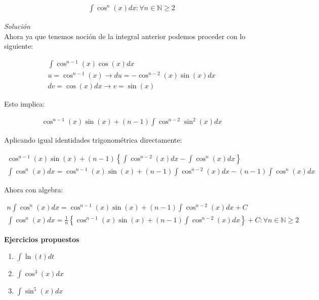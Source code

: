 \vspace{1cm}
\begin{equation}
    \begin{gathered}
        \int \cos^{n}(x)dx \colon \forall n\in\mathbb{N}\geq 2
    \end{gathered}
\end{equation}

\textit{Solución}\\

Ahora ya que tenemos noción de la integral anterior podemos proceder con lo siguiente:

\begin{equation*}
    \begin{gathered}
        \int\cos^{n-1}(x)\cos(x)dx\\
        u=\cos^{n-1}(x)\rightarrow du=-\cos^{n-2}(x)\sin(x)dx\\
        dv=\cos(x)dx \rightarrow v=\sin(x)
    \end{gathered}
\end{equation*}

Esto implica:

\begin{equation*}
    \begin{gathered}
        \cos^{n-1}(x)\sin(x)+(n-1)\int\cos^{n-2}\sin^{2}(x)dx
    \end{gathered}
\end{equation*}

Aplicando igual identidades trigonométrica directamente:

\begin{equation*}
    \begin{gathered}
        \cos^{n-1}(x)\sin(x)+(n-1)\left\{\int\cos^{n-2}(x)dx - \int\cos^{n}(x)dx\right\}\\
        \int\cos^{n}(x)dx =\cos^{n-1}(x)\sin(x)+(n-1)\int\cos^{n-2}(x)dx-(n-1)\int\cos^{n}(x)dx\ 
    \end{gathered}
\end{equation*}

Ahora con algebra:

\begin{equation*}
    \begin{gathered}
        n\int\cos^{n}(x)dx =\cos^{n-1}(x)\sin(x)+(n-1)\int\cos^{n-2}(x)dx+C\\
        \int\cos^{n}(x)dx =\frac{1}{n}\left\{\cos^{n-1}(x)\sin(x)+(n-1)\int\cos^{n-2}(x)dx\right\}+C \colon \forall n\in\mathbb{N}\geq 2
    \end{gathered}
\end{equation*}

\textbf{Ejercicios propuestos}

\begin{enumerate}
  \item \(\displaystyle\int\ln(t)dt\)
  \item \(\displaystyle\int \cos^{3}(x)dx\)
  \item \(\displaystyle\int \sin^{5}(x)dx\)
\end{enumerate}
\clearpage